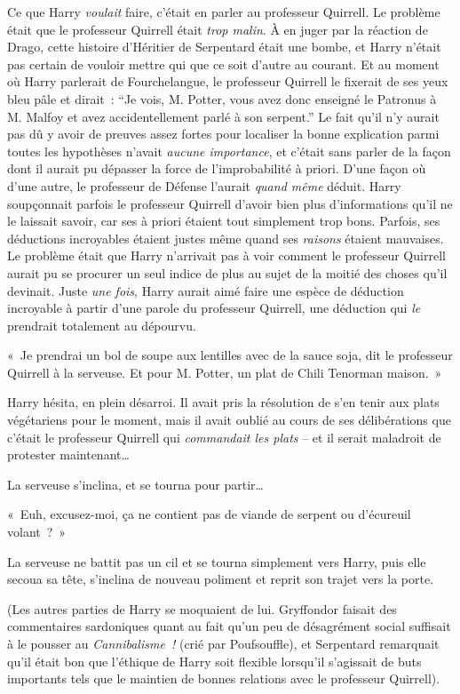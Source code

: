 Ce que Harry \emph{voulait} faire, c'était en parler au professeur Quirrell. Le problème était que le professeur Quirrell était \emph{trop malin}. À en juger par la réaction de Drago, cette histoire d'Héritier de Serpentard était une bombe, et Harry n'était pas certain de vouloir mettre qui que ce soit d'autre au courant. Et au moment où Harry parlerait de Fourchelangue, le professeur Quirrell le fixerait de ses yeux bleu pâle et dirait~: “Je vois, M. Potter, vous avez donc enseigné le Patronus à M. Malfoy et avez accidentellement parlé à son serpent.”
Le fait qu'il n'y aurait pas dû y avoir de preuves assez fortes pour localiser la bonne explication parmi toutes les hypothèses n'avait \emph{aucune importance}, et c'était sans parler de la façon dont il aurait pu dépasser la force de l'improbabilité à priori. D'une façon où d'une autre, le professeur de Défense l'aurait \emph{quand même} déduit. Harry soupçonnait parfois le professeur Quirrell d'avoir bien plus d'informations qu'il ne le laissait savoir, car ses à priori étaient tout simplement trop bons. Parfois, ses déductions incroyables étaient justes même quand ses \emph{raisons} étaient mauvaises. Le problème était que Harry n'arrivait pas à voir comment le professeur Quirrell aurait pu se procurer un seul indice de plus au sujet de la moitié des choses qu'il devinait. Juste \emph{une fois}, Harry aurait aimé faire une espèce de déduction incroyable à partir d'une parole du professeur Quirrell, une déduction qui \emph{le} prendrait totalement au dépourvu.

\later

«~Je prendrai un bol de soupe aux lentilles avec de la sauce soja, dit le professeur Quirrell à la serveuse. Et pour M. Potter, un plat de Chili Tenorman maison.~»

Harry hésita, en plein désarroi. Il avait pris la résolution de s'en tenir aux plats végétariens pour le moment, mais il avait oublié au cours de ses délibérations que c'était le professeur Quirrell qui \emph{commandait les plats} -- et il serait maladroit de protester maintenant…

La serveuse s'inclina, et se tourna pour partir…

«~Euh, excusez-moi, ça ne contient pas de viande de serpent ou d'écureuil volant~?~»

La serveuse ne battit pas un cil et se tourna simplement vers Harry, puis elle secoua sa tête, s'inclina de nouveau poliment et reprit son trajet vers la porte.

(Les autres parties de Harry se moquaient de lui. Gryffondor faisait des commentaires sardoniques quant au fait qu'un peu de désagrément social suffisait à le pousser au \emph{Cannibalisme~!} (crié par Poufsouffle), et Serpentard remarquait qu'il était bon que l'éthique de Harry soit flexible lorsqu'il s'agissait de buts importants tels que le maintien de bonnes relations avec le professeur Quirrell).

